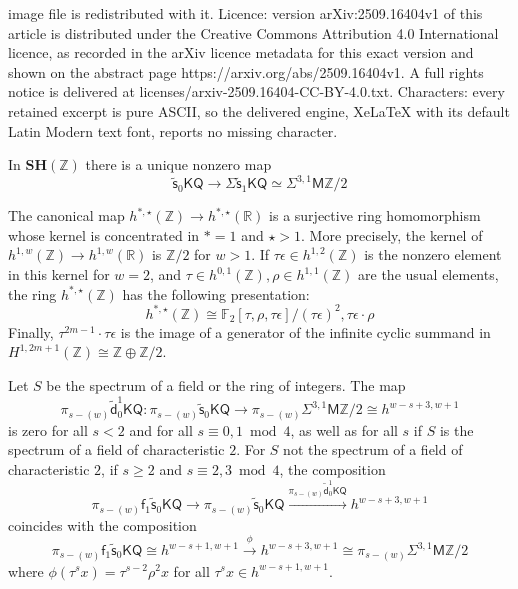 \documentclass[10pt,a4paper]{amsart}
\let\iso=\cong
\newcommand{\FF}{\mathbb{F}}
\newcommand{\KQ}{\mathsf{KQ}}
\newcommand{\MZ}{\mathsf{M}\Z}
\newcommand{\R}{\mathbb{R}}
\newcommand{\SH}{\mathbf{SH}}
\newcommand{\Z}{\mathbb{Z}}
\newcommand{\f}{\mathsf{f}}
\newcommand{\vd}{{\tilde{\mathsf{d}}}}
\newcommand{\vs}{\tilde{\mathsf{s}}}
\begin{document}
image file is redistributed with it. Licence: version arXiv:2509.16404v1 of this article is distributed under the Creative Commons Attribution 4.0 International licence, as recorded in the arXiv licence metadata for this exact version and shown on the abstract page https://arxiv.org/abs/2509.16404v1. A full rights notice is delivered at licenses/arxiv-2509.16404-CC-BY-4.0.txt. Characters: every retained excerpt is pure ASCII, so the delivered engine, XeLaTeX with its default Latin Modern text font, reports no missing character.
\begin{lemma}\label{lem:unique-v-operation}
In $\SH(\Z)$ there is a unique nonzero map
\[ \vs_0\KQ\to \Sigma\vs_1\KQ \simeq \Sigma^{3,1}\MZ/2\]
\end{lemma}

\begin{lemma}\label{lem:hZ}
The canonical map $h^{\ast,\star}(\Z)\to h^{\ast,\star}(\R)$ is a surjective ring homomorphism whose kernel is concentrated in $\ast=1$ and $\star>1$. 
More precisely, the kernel of $h^{1,w}(\Z)\to h^{1,w}(\R)$ is $\Z/2$ for $w>1$.
If $\tau\epsilon\in h^{1,2}(\Z)$ is the nonzero element in this kernel for $w=2$, 
and $\tau\in h^{0,1}(\Z),\rho\in h^{1,1}(\Z)$ are the usual elements, 
the ring $h^{\ast,\star}(\Z)$ has the following presentation:
\[ 
h^{\ast,\star}(\Z)\iso 
\FF_2[\tau,\rho,\tau\epsilon]/(\tau\epsilon)^2,\tau\epsilon\cdot \rho
\]
Finally, 
$\tau^{2m-1}\cdot \tau\epsilon $ is the image of a generator of the infinite cyclic summand in 
$H^{1,2m+1}(\Z)\cong \Z\oplus \Z/2$.
\end{lemma}

\begin{lemma}\label{lem:vd-KQ-on-pi}
Let $S$ be the spectrum of a field or the ring of integers.
The map 
\[ \pi_{s-(w)}\vd^1_0\KQ \colon \pi_{s-(w)}\vs_{0}\KQ \to \pi_{s-(w)}\Sigma^{3,1}\MZ/2\iso h^{w-s+3,w+1}\]
is zero for all $s<2$ and for all $s\equiv 0,1 \bmod 4$, as well as for all $s$ if $S$ is the spectrum of a field of characteristic $2$.
For $S$ not the spectrum of a field of characteristic $2$, if $s\geq 2$ and $s\equiv 2,3 \bmod 4$, the composition
\[ \pi_{s-(w)}\f_1\vs_0\KQ \to \pi_{s-(w)}\vs_0\KQ \xrightarrow{\pi_{s-(w)}\vd^1_0\KQ} h^{w-s+3,w+1}\]
coincides with the composition
\[ \pi_{s-(w)}\f_1\vs_0\KQ \iso h^{w-s+1,w+1}\xrightarrow{\phi} h^{w-s+3,w+1}\iso \pi_{s-(w)}\Sigma^{3,1}\MZ/2\]
where $\phi(\tau^{s}x)=\tau^{s-2}\rho^2x$ for all $\tau^sx\in h^{w-s+1,w+1}$.
\end{lemma}
\end{document}
